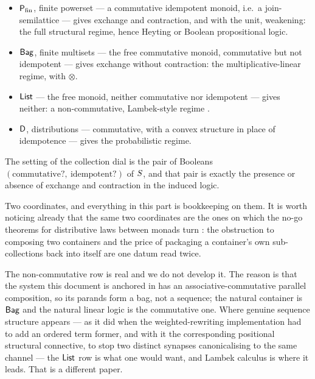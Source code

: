 \begin{itemize}[leftmargin=1.4em]
\item $\mathsf{P}_{\mathrm{fin}}$, finite powerset --- a commutative idempotent monoid, i.e.\ a
join-semilattice --- gives exchange and contraction, and with the unit, weakening:
the full structural regime, hence Heyting or Boolean propositional logic.
\item $\mathsf{Bag}$, finite multisets --- the free commutative monoid, commutative but
not idempotent --- gives exchange without contraction: the multiplicative-linear
regime, with $\otimes$.
\item $\mathsf{List}$ --- the free monoid, neither commutative nor idempotent --- gives
neither: a non-commutative, Lambek-style regime \cite{Lambek58}.
\item $\mathsf{D}$, distributions --- commutative, with a convex structure in place of
idempotence --- gives the probabilistic regime.
\end{itemize}

\begin{principle}
\label{prin:dial}
The setting of the collection dial is the pair of Booleans
$(\text{commutative?},\ \text{idempotent?})$ of $S$, and that pair is exactly
the presence or absence of exchange and contraction in the induced logic.
\end{principle}

Two coordinates, and everything in this part is bookkeeping on them. It is worth
noticing already that the same two coordinates are the ones on which the no-go
theorems for distributive laws between monads turn \cite{ZwartMarsden19}: the
obstruction to composing two containers and the price of packaging a container's
own sub-collections back into itself are one datum read twice.

\begin{remark}
\label{rem:commutative}
The non-commutative row is real and we do not develop it. The reason is that the
system this document is anchored in has an associative-commutative parallel
composition, so its parands form a bag, not a sequence; the natural container is
$\mathsf{Bag}$ and the natural linear logic is the commutative one. Where genuine
sequence structure appears --- as it did when the weighted-rewriting
implementation had to add an ordered term former, and with it the corresponding
positional structural connective, to stop two distinct synapses canonicalising to
the same channel \cite{WeightedGSLT} --- the $\mathsf{List}$ row is what one would want,
and Lambek calculus is where it leads. That is a different paper.
\end{remark}

